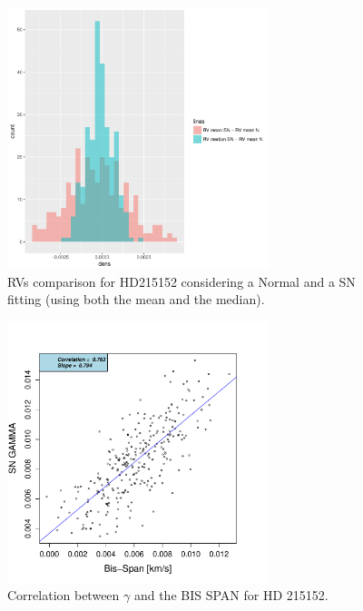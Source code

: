 \documentclass[11pt, oneside]{article}
\begin{document}
{%
%
\begin{figure}[htbp]
   \centering
\includegraphics[height = 3in]{[0]HD21515_HistogramsDiff.pdf} 
   \caption{RVs comparison for HD215152 considering a Normal and a SN fitting (using both the mean and the median).}
   \label{fig:HD215152:RV}
\end{figure}
%
\begin{figure}[htbp]
   \centering
\includegraphics[height = 3in]{HD21515_[2]gamma_vs_bisspan.pdf} 
   \caption{Correlation between $\gamma$ and the BIS SPAN for HD 215152.}
   \label{fig:HD215152:corr.gamma}
\end{figure}
%


}
\end{document}
